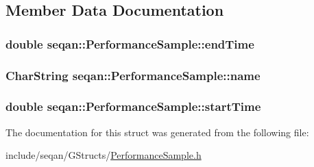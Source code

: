 \subsection{Member Data Documentation}
\hypertarget{structseqan_1_1_performance_sample_a56846d44d5d90ff877cb09ac3a50408d}{
\subsubsection[{end\-Time}]{\setlength{\rightskip}{0pt plus 5cm}double seqan\-::\-Performance\-Sample\-::end\-Time}}\label{structseqan_1_1_performance_sample_a56846d44d5d90ff877cb09ac3a50408d}
\hypertarget{structseqan_1_1_performance_sample_ad57c1dc73d7aeead774dc52c2bc9c21e}{
\subsubsection[{name}]{\setlength{\rightskip}{0pt plus 5cm}Char\-String seqan\-::\-Performance\-Sample\-::name}}\label{structseqan_1_1_performance_sample_ad57c1dc73d7aeead774dc52c2bc9c21e}
\hypertarget{structseqan_1_1_performance_sample_aa836fab9103241ea23d5da5642aea14f}{
\subsubsection[{start\-Time}]{\setlength{\rightskip}{0pt plus 5cm}double seqan\-::\-Performance\-Sample\-::start\-Time}}\label{structseqan_1_1_performance_sample_aa836fab9103241ea23d5da5642aea14f}


The documentation for this struct was generated from the following file\-:\begin{DoxyCompactItemize}
\item 
include/seqan/\-G\-Structs/\hyperlink{_performance_sample_8h}{Performance\-Sample.\-h}\end{DoxyCompactItemize}
